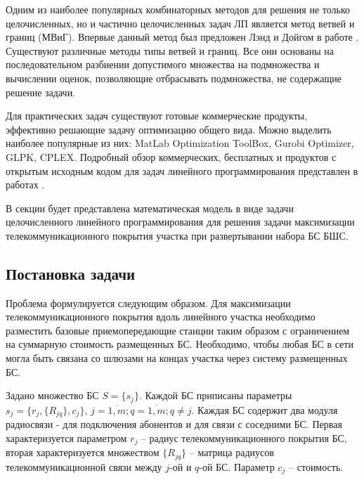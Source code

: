 Одним из наиболее популярных комбинаторных методов для решения не только целочисленных, но и частично целочисленных задач ЛП является метод ветвей и границ (МВиГ). Впервые данный метод  был предложен Лэнд и Дойгом в работе \cite{Land1960}. Существуют различные методы типы ветвей и границ. Все они основаны на последовательном разбиении допустимого множества на подмножества и вычислении оценок, позволяющие отбрасывать подмножества, не содержащие решение задачи.





Для  практических задач существуют готовые коммерческие продукты, эффективно решающие задачу оптимизацию общего вида. Можно выделить наиболее популярные из них: MatLab Optimization ToolBox, Gurobi Optimizer, GLPK, CPLEX. Подробный обзор коммерческих, бесплатных и продуктов с открытым исходным кодом для задач линейного программирования представлен в работах \cite{Meindl2012, Ku2016, Anand2017}. 

В секции будет представлена математическая модель в виде задачи целочисленного линейного программирования для решения задачи максимизации телекоммуникационного покрытия участка при развертывании набора БС БШС.

\subsection{Постановка задачи}

Проблема формулируется следующим образом. Для максимизации телекоммуникационного покрытия вдоль линейного участка необходимо разместить базовые приемопередающие станции таким образом с ограничением на суммарную стоимость размещенных БС. Необходимо, чтобы любая БС в сети могла быть связана со шлюзами на концах участка через систему размещенных БС.

Задано множество БС $S = \{s_j\}$. Каждой БС приписаны параметры  $s_j = \{r_j, \{R_{jq}\}, c_j \}$, $j = \overline{1,m}; q = \overline{1,m}; q \neq j$. 
Каждая БС содержит два модуля радиосвязи - для подключения абонентов и для связи с соседними БС. Первая характеризуется параметром $r_j$ -- радиус телекоммуникационного покрытия БС, вторая характеризуется множеством $\{R_{jq} \}$ -- матрица радиусов телекоммуникационной связи между $j$-ой и $q$-ой БС. Параметр $c_j$ -- стоимость. 

